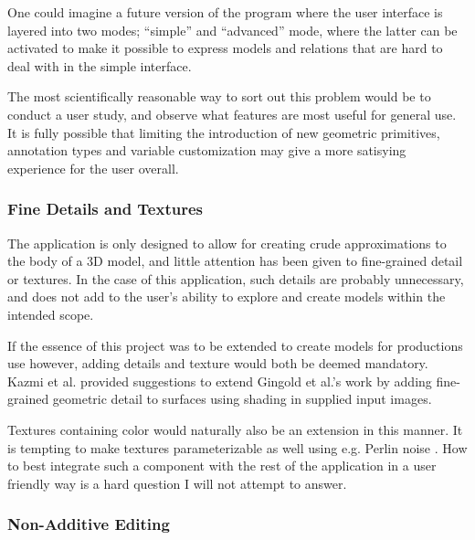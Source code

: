 \documentclass[english]{article}
\begin{document}
One could imagine a future version of the program where the user interface is layered into two modes; ``simple'' and ``advanced'' mode, where the latter can be activated to make it possible to express models and relations that are hard to deal with in the simple interface.

The most scientifically reasonable way to sort out this problem would be to conduct a user study, and observe what features are most useful for general use. It is fully possible that limiting the introduction of new geometric primitives, annotation types and variable customization may give a more satisying experience for the user overall.

\subsubsection{Fine Details and Textures}

The application is only designed to allow for creating crude approximations to the body of a 3D model, and little attention has been given to fine-grained detail or textures. In the case of this application, such details are probably unnecessary, and does not add to the user's ability to explore and create models within the intended scope.

If the essence of this project was to be extended to create models for productions use however, adding details and texture would both be deemed mandatory. Kazmi et al. \cite{hybrid_character_modeling} provided suggestions to extend Gingold et al.'s work by adding fine-grained geometric detail to surfaces using shading in supplied input images.

Textures containing color would naturally also be an extension in this manner. It is tempting to make textures parameterizable as well using e.g. Perlin noise \cite{perlin_noise}. How to best integrate such a component with the rest of the application in a user friendly way is a hard question I will not attempt to answer.

\subsubsection{Non-Additive Editing}

\end{document}
